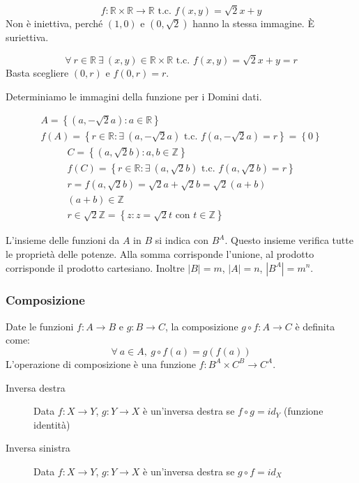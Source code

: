 \[
f: \mathbb{R} \times \mathbb{R} \to \mathbb{R} \text{ t.c. } f(x,y) = \sqrt{2}x + y
\] 
Non \`e iniettiva, perch\'e $(1,0)$ e $(0,\sqrt{2})$ hanno la stessa immagine. \`E suriettiva.

\[
\forall \ r \in \mathbb{R} \ \exists \ (x,y) \in \mathbb{R} \times \mathbb{R} \text{ t.c. } f(x,y) = \sqrt{2} x + y = r
\]
Basta scegliere $(0,r)$ e $f(0,r) = r$.

Determiniamo le immagini della funzione per i Domini dati.

\begin{gather*}
A = \left\{ \left( a, - \sqrt{2}a\right) : a \in \mathbb{R}  \right\} \\
f(A) = \left\{ r \in \mathbb{R} : \exists \ (a, - \sqrt{2}a) \text{ t.c. } f(a, - \sqrt{2} a) = r \right\} = \left\{ 0 \right\}
\end{gather*}
\begin{gather*}
C = \left\{ (a, \sqrt{2} b) : a, b \in \mathbb{Z} \right\} \\
f(C) = \left\{ r \in \mathbb{R} : \exists \ (a, \sqrt{2} b) \text{ t.c. } f(a, \sqrt{2}b) = r \right\} \\
r = f(a, \sqrt{2} b) = \sqrt{2} a + \sqrt{2} b = \sqrt{2} (a + b) \\
(a+b) \in \mathbb{Z} \\
r \in \sqrt{2} \mathbb{Z} = \left\{z : z = \sqrt{2} t \text{ con } t \in \mathbb{Z} \right\}
\end{gather*}

L'insieme delle funzioni da $A$ in $B$ si indica con $B^A$. Questo insieme verifica tutte le propriet\`a delle potenze. Alla somma corrisponde l'unione, al prodotto corrisponde il prodotto cartesiano. Inoltre $|B| = m$, $|A| = n$, $|B^A| = m^n$.

\subsubsection{Composizione}

Date le funzioni $f : A \to B$ e $g : B \to C$, la composizione $g \circ f : A \to C$ \`e definita come:
\[
\forall \ a \in A , \ {g \circ f}(a) = g(f(a))
\]
L'operazione di composizione \`e una funzione $f : B^A \times C^B \to C^A$.

\begin{description}
  \item[Inversa destra] Data $f : X \to Y$, $g : Y \to X$ \`e un'inversa destra se $f \circ g = id_Y$ (funzione identit\`a)
  \item[Inversa sinistra] Data $f : X \to Y$, $g : Y \to X$ \`e un'inversa destra se $g \circ f = id_X$
\end{description}

